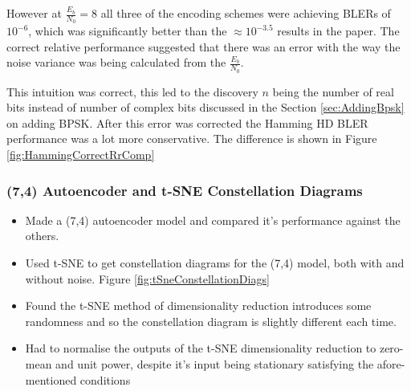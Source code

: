 \documentclass[12pt,onecolumn,letterpaper]{article}
\begin{document}
However at $\frac{E_b}{N_0} = 8$ all three of the encoding schemes were achieving BLERs of $10^{-6}$, which was significantly better than the $\approx10^{-3.5}$ results in the paper. The correct relative performance suggested that there was an error with the way the noise variance was being calculated from the $\frac{E_b}{N_0}$.

This intuition was correct, this led to the discovery $n$ being the number of real bits instead of number of complex bits discussed in the Section \ref{sec:AddingBpsk} on adding BPSK. After this error was corrected the Hamming HD BLER performance was a lot more conservative. The difference is shown in Figure \ref{fig:HammingCorrectRrComp}

\subsubsection{(7,4) Autoencoder and t-SNE Constellation Diagrams}

\begin{itemize}
   \item Made a (7,4) autoencoder model and compared it's performance against the others.
   \item Used t-SNE to get constellation diagrams for the (7,4) model, both with and without noise. Figure \ref{fig:tSneConstellationDiags}
   \item Found the t-SNE method of dimensionality reduction introduces some randomness and so the constellation diagram is slightly different each time.
   \item Had to normalise the outputs of the t-SNE dimensionality reduction to zero-mean and unit power, despite it's input being stationary satisfying the afore-mentioned conditions
\end{itemize}
\end{document}
